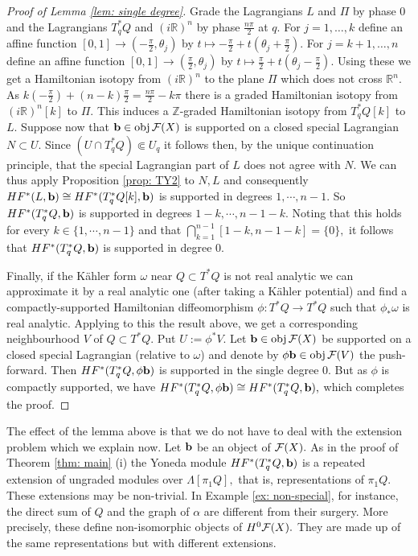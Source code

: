 \documentclass{article}
\theoremstyle{plain}%
\theoremstyle{definition}
\numberwithin{equation}{section}
\numberwithin{figure}{section}
\def\cF{{\mathbin{\cal F}}}
\def\R{{\mathbin{\mathbb R}}}
\def\Z{{\mathbin{\mathbb Z}}}
\def\al{\alpha}
\def\th{\theta}
\def\om{\omega}
\def\ph{\phi}
\def\La{\Lambda}
\begin{document}
\begin{proof}[Proof of Lemma \ref{lem: single degree}]
Grade the Lagrangians $L$ and $\Pi$ by phase $0$ and the Lagrangians $T_q^*Q$ and $(i\R)^n$ by phase $\frac{n\pi}2$ at $q.$
For $j=1,\dots,k$ define an affine function $[0,1]\to (-\frac\pi2,\th_j)$ by $t\mapsto -\frac\pi2+t(\th_j+\frac\pi2).$ 
For $j=k+1,\dots,n$ define an affine function $[0,1]\to (\frac\pi2,\th_j)$ by $t\mapsto \frac\pi2+t(\th_j-\frac\pi2).$ 
Using these we get a Hamiltonian isotopy from $(i\R)^n$ to the plane $\Pi$ which does not cross $\R^n.$
As $k(-\frac\pi2)+(n-k) \frac\pi2=\frac{n\pi}2-k\pi$ there is a graded Hamiltonian isotopy from $(i\R)^n[k]$ to $\Pi.$
This induces a $\Z$-graded Hamiltonian isotopy from $T_q^*Q[k]$ to $L.$
Suppose now that $\b\in \obj\cF(X)$ is supported on a closed special Lagrangian $N\subset U.$
Since $(U\cap T_q^*Q)\Subset U_q$ it follows then, by the unique continuation principle, that the special Lagrangian part of $L$ does not agree with $N.$
We can thus apply Proposition \ref{prop: TY2} to $N,L$ and consequently $HF^*(L,{\mathbf{b}})\cong HF^*(T_q^*Q[k],{\mathbf{b}})$ is supported in degrees $1,\cdots,n-1.$
So $HF^*(T_q^*Q,{\mathbf{b}})$ is supported in degrees $1-k,\cdots,n-1-k.$ Noting that this holds for every $k\in\{1,\cdots,n-1\}$ and that $\bigcap_{k=1}^{n-1}[1-k,n-1-k]=\{0\},$ it follows that $HF^*(T_q^*Q,{\mathbf{b}})$ is supported in degree $0.$

Finally, if the K\"ahler form $\om$ near $Q\subset T^*Q$ is not real analytic we can approximate it by a real analytic one (after taking a K\"ahler potential) and find a compactly-supported Hamiltonian diffeomorphism $\ph: T^*Q\to T^*Q$ such that $\ph_*\om$ is real analytic. Applying to this the result above, we get a corresponding neighbourhood $V$ of $Q\subset T^*Q.$
Put $U:=\ph^*V.$ Let $\b\in \obj\cF(X)$ be supported on a closed special Lagrangian (relative to $\om$) and denote by $\ph\b\in \obj\cF(V)$ the push-forward.
Then $HF^*(T_q^*Q,\ph\b)$ is supported in the single degree $0.$
But as $\ph$ is compactly supported, we have $HF^*(T_q^*Q,\ph\b)\cong HF^*(T_q^*Q,\b),$ which completes the proof.
\end{proof}

The effect of the lemma above is that we do not have to deal with the extension problem which we explain now.
Let ${\mathbf{b}}$ be an object of $\cF(X).$
As in the proof of Theorem \ref{thm: main} (i) the Yoneda module $HF^*(T_q^*Q,{\mathbf{b}})$ is a repeated extension of ungraded modules over $\La[\pi_1Q],$ that is, representations of $\pi_1Q.$
These extensions may be non-trivial.
In Example \ref{ex: non-special}, for instance, the direct sum of $Q$ and the graph of $\al$ are different from their surgery.
More precisely, these define non-isomorphic objects of $H^0\cF(X).$ They are made up of the same representations but with different extensions.
\end{document}
